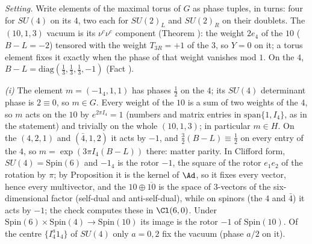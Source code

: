 \emph{Setting.} Write elements of the maximal torus of $G$ as phase tuples, in turns: four for $SU(4)$ on its $4$, two each for $SU(2)_{L}$ and $SU(2)_{R}$ on their doublets. The $(10,1,3)$ vacuum is its $\nu^{c}\nu^{c}$ component (Theorem ): the weight $2e_{4}$ of the $10$ ($B - L = -2$) tensored with the weight $T_{3R} = +1$ of the $3$, so $Y = 0$ on it; a torus element fixes it exactly when the phase of that weight vanishes mod $1$. On the $4$, $B - L = \mathrm{diag}(\tfrac13, \tfrac13, \tfrac13, -1)$ (Fact ).

\emph{(i)} The element $m = (-1_{4}, 1, 1)$ has phases $\tfrac12$ on the $4$; its $SU(4)$ determinant phase is $2 \equiv 0$, so $m \in G$. Every weight of the $10$ is a sum of two weights of the $4$, so $m$ acts on the $10$ by $e^{2\pi I_{4}} = 1$ (numbers and matrix entries in $\mathrm{span}\{1, I_{4}\}$, as in the statement) and trivially on the whole $(10,1,3)$; in particular $m \in H$. On the $(4,2,1)$ and $(\bar4,1,2)$ it acts by $-1$, and $\tfrac32(B - L) \equiv \tfrac12$ on every entry of the $4$, so $m = \exp(3\pi I_{4}(B - L))$ there: matter parity. In Clifford form, $SU(4) = \mathrm{Spin}(6)$ and $-1_{4}$ is the rotor $-1$, the square of the rotor $e_{1}e_{2}$ of the rotation by $\pi$; by Proposition  it is the kernel of $\Ad$, so it fixes every vector, hence every multivector, and the $10 \oplus \overline{10}$ is the space of $3$-vectors of the six-dimensional factor (self-dual and anti-self-dual), while on spinors (the $4$ and $\bar 4$) it acts by $-1$; the check computes these in $\Cl(6,0)$. Under $\mathrm{Spin}(6) \times \mathrm{Spin}(4) \to \mathrm{Spin}(10)$ its image is the rotor $-1$ of $\mathrm{Spin}(10)$. Of the centre $\{I_{4}^{a}1_{4}\}$ of $SU(4)$ only $a = 0, 2$ fix the vacuum (phase $a/2$ on it).

